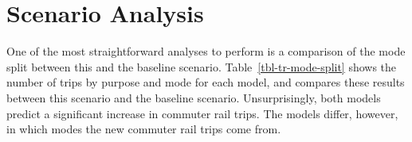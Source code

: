 \documentclass[fancy, oneside, mastersfancy, ms]{byuthesis}
\begin{document}
\section{Scenario Analysis}\label{scenario-analysis-1}

One of the most straightforward analyses to perform is a comparison of
the mode split between this and the baseline scenario.
Table~\ref{tbl-tr-mode-split} shows the number of trips by purpose and
mode for each model, and compares these results between this scenario
and the baseline scenario. Unsurprisingly, both models predict a
significant increase in commuter rail trips. The models differ, however,
in which modes the new commuter rail trips come from.

\begin{table}

\caption{\label{tbl-tr-mode-split}Change in Mode Split with Improved
Transit}

\end{table}
\end{document}
